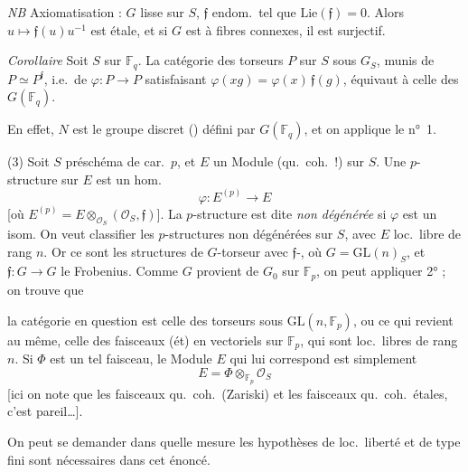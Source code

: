 \documentclass[11pt,a4paper]{article}
\begin{document}
\emph{NB} Axiomatisation : $G$ lisse sur $S$, $\mathfrak{f}$ endom.\ tel que
$\mathrm{Lie}(\mathfrak{f}) = 0$. Alors $u \mapsto \mathfrak{f}(u)u^{-1}$ est
étale, et si $G$ est à fibres connexes, il est surjectif.


\emph{Corollaire} Soit $S$ sur $\mathbb{F}_q$. La catégorie des torseurs $P$
sur $S$ sous $G_S$, munis de $P \simeq P^{\mathfrak{f}}$, i.e.\ de
$\varphi : P \to P$ satisfaisant
$\varphi(xg) = \varphi(x)\,\mathfrak{f}(g)$, équivaut à celle des
$G(\mathbb{F}_q)$.

En effet, $N$ est le groupe discret  () défini par
$G(\mathbb{F}_q)$, et on applique le n°~1.

(3) Soit $S$ préschéma de car.\ $p$, et $E$ un Module
(qu.\ coh.\ !) sur $S$. Une $p$-structure sur $E$ est un hom.
\[
  \varphi : E^{(p)} \longrightarrow E
\]
[où $E^{(p)} = E \otimes_{\mathcal{O}_S} (\mathcal{O}_S, \mathfrak{f})$]. La
$p$-structure est dite \emph{non dégénérée} si $\varphi$ est un isom. On veut
classifier les $p$-structures non dégénérées sur $S$, avec $E$ loc.\ libre de rang
$n$. Or ce sont les structures de $G$-torseur avec
$\mathfrak{f}$-, où $G = \mathrm{GL}(n)_S$, et
$\mathfrak{f} : G \to G$ le Frobenius. Comme $G$ provient de $G_0$ sur
$\mathbb{F}_p$, on peut appliquer 2° ; on trouve que


la catégorie en question est celle des torseurs sous
$\mathrm{GL}(n, \mathbb{F}_p)$, ou ce qui revient au même, celle des
faisceaux (ét) en  vectoriels sur $\mathbb{F}_p$, qui sont
loc.\ libres de rang $n$. Si $\Phi$ est un tel faisceau, le Module $E$ qui lui
correspond est simplement
\[
  E = \Phi \otimes_{\mathbb{F}_p} \mathcal{O}_S
\]
[ici on note que les faisceaux qu.\ coh.\ (Zariski) et les faisceaux qu.\
coh.\ étales, c'est pareil\ldots].

On peut se demander dans quelle mesure les hypothèses de loc.\ liberté et de
type fini sont nécessaires dans cet énoncé.
\end{document}
